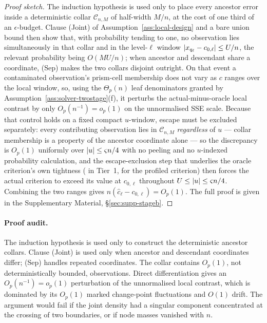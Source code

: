 \documentclass[11pt]{article}
\theoremstyle{plain}
\theoremstyle{definition}
\theoremstyle{remark}
\DeclarePairedDelimiter{\abs}{\lvert}{\rvert}
\begin{document}
\begin{proof}[Proof sketch]
The induction hypothesis is used only to place every ancestor error inside a
deterministic collar $\mathcal C_{n,M}$ of half-width $M/n$, at the cost of one
third of an $\epsilon$-budget. Clause (Joint) of
Assumption~\ref{ass:local-design} and a bare union bound then show
that, with probability tending to one, no observation lies simultaneously in
that collar and in the level-$\ell$ window
$\abs{x_{q_\ell}-c_{0,\ell}}\le U/n$, the relevant probability being
$O(MU/n)$; when ancestor and descendant share a coordinate, (Sep) makes the two
collars disjoint outright. On that event a contaminated observation's
prism-cell membership does not vary as $c$ ranges over the local window, so,
using the $\Theta_p(n)$ leaf denominators granted by
Assumption~\ref{ass:solver-twostage}(f), it perturbs the actual-minus-oracle
local contrast by only $O_p(n^{-1})=o_p(1)$ on the unnormalised SSE scale.
Because that control holds on a fixed compact $u$-window, escape must be
excluded separately: every contributing observation lies in
$\mathcal C_{n,M}$ \emph{regardless} of $u$ --- collar membership is a property
of the ancestor coordinate alone --- so the discrepancy is $O_p(1)$ uniformly
over $\abs u\le\varsigma n/4$ with no peeling and no $u$-indexed probability
calculation, and the escape-exclusion step that underlies the oracle
criterion's own tightness (\citealt{chan1993,seijosen2011} in Tier~1,
\citealt{seootsu2018} for the profiled criterion) then forces the actual
criterion to exceed its value at $c_{0,\ell}$ throughout
$U\le\abs u\le\varsigma n/4$. Combining the two ranges gives
$n(\widehat c_\ell-c_{0,\ell})=O_p(1)$. The full proof is given in the
Supplementary Material, \S\ref{sec:supp-stageb}.
\end{proof}

\paragraph{Proof audit.}
The induction hypothesis is used only to construct the deterministic
ancestor collars.  Clause (Joint) is used only when ancestor and descendant
coordinates differ; (Sep) handles repeated coordinates.  The collar contains
\(O_p(1)\), not deterministically bounded, observations.  Direct
differentiation gives an \(O_p(n^{-1})=o_p(1)\) perturbation of the
unnormalised local contrast, which is dominated by its \(O_p(1)\) marked
change-point fluctuations and \(O(1)\) drift.  The argument would fail if the
joint density had a singular component concentrated at the crossing of two
boundaries, or if node masses vanished with \(n\).
\end{document}
